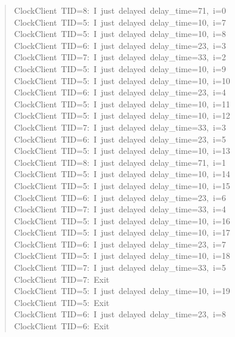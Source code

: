 \documentclass[letterpaper]{article}
\begin{document}
\begin{quote}
{ClockClient~TID=8:~I~just~delayed~delay\_time=71,~i=0\\
ClockClient~TID=5:~I~just~delayed~delay\_time=10,~i=7\\
ClockClient~TID=5:~I~just~delayed~delay\_time=10,~i=8\\
ClockClient~TID=6:~I~just~delayed~delay\_time=23,~i=3\\
ClockClient~TID=7:~I~just~delayed~delay\_time=33,~i=2\\
ClockClient~TID=5:~I~just~delayed~delay\_time=10,~i=9\\
ClockClient~TID=5:~I~just~delayed~delay\_time=10,~i=10\\
ClockClient~TID=6:~I~just~delayed~delay\_time=23,~i=4\\
ClockClient~TID=5:~I~just~delayed~delay\_time=10,~i=11\\
ClockClient~TID=5:~I~just~delayed~delay\_time=10,~i=12\\
ClockClient~TID=7:~I~just~delayed~delay\_time=33,~i=3\\
ClockClient~TID=6:~I~just~delayed~delay\_time=23,~i=5\\
ClockClient~TID=5:~I~just~delayed~delay\_time=10,~i=13\\
ClockClient~TID=8:~I~just~delayed~delay\_time=71,~i=1\\
ClockClient~TID=5:~I~just~delayed~delay\_time=10,~i=14\\
ClockClient~TID=5:~I~just~delayed~delay\_time=10,~i=15\\
ClockClient~TID=6:~I~just~delayed~delay\_time=23,~i=6\\
ClockClient~TID=7:~I~just~delayed~delay\_time=33,~i=4\\
ClockClient~TID=5:~I~just~delayed~delay\_time=10,~i=16\\
ClockClient~TID=5:~I~just~delayed~delay\_time=10,~i=17\\
ClockClient~TID=6:~I~just~delayed~delay\_time=23,~i=7\\
ClockClient~TID=5:~I~just~delayed~delay\_time=10,~i=18\\
ClockClient~TID=7:~I~just~delayed~delay\_time=33,~i=5\\
ClockClient~TID=7:~Exit\\
ClockClient~TID=5:~I~just~delayed~delay\_time=10,~i=19\\
ClockClient~TID=5:~Exit\\
ClockClient~TID=6:~I~just~delayed~delay\_time=23,~i=8\\
ClockClient~TID=6:~Exit\\
}
\end{quote}
\end{document}
